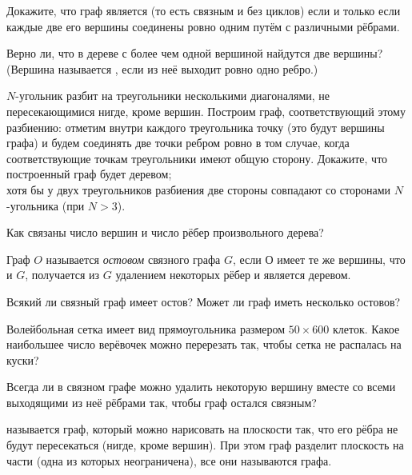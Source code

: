 \documentclass[a4paper,11pt]{article}
\begin{document}
\thispagestyle{empty}



Докажите, что граф является 
(то есть связным и без циклов) если и только если каждые
две его вершины соединены ровно одним пут\"ем с различными р\"ебрами.

Верно ли, что в дереве с более чем одной вершиной найдутся
две 
вершины? (Вершина называется , если из не\"е выходит ровно одно
ребро.)

$N$-угольник разбит на треугольники несколькими диагоналями, не
пересекающимися нигде, кроме вершин.
Построим граф, соответствующий этому разбиению: отметим внутри каждого
треугольника точку (это будут вершины
графа) и будем соединять две точки ребром ровно в том случае,
когда соответствующие точкам треугольники имеют общую сторону. Докажите, что \quad
 построенный граф будет деревом;\\
хотя бы у двух
треугольников разбиения две стороны
совпадают со сторонами $N$-угольника (при $N>3$).


Как связаны число вершин и число р\"ебер произвольного дерева?

Граф $O$ называется {\it остовом} связного графа $G$,
если $О$ имеет те же вершины, что и $G$,
получается из $G$ удалением некоторых р\"ебер и является деревом.

Всякий ли связный граф имеет остов? Может ли граф иметь несколько остовов?

 Волейбольная сетка имеет вид прямоугольника размером $50\times600$
клеток. Какое наибольшее число вер\"евочек можно перерезать так, чтобы
сетка не распалась на куски?

Всегда ли в связном графе можно удалить некоторую вершину
вместе со всеми выходящими из не\"е р\"ебрами так, чтобы граф
остался связным?


   называется граф, который можно нарисовать
на плоскости так, что его
р\"ебра не будут пересекаться (нигде, кроме вершин). При этом
граф разделит плоскость на части (одна из которых
неограничена), все они называются  графа.
\end{document}
